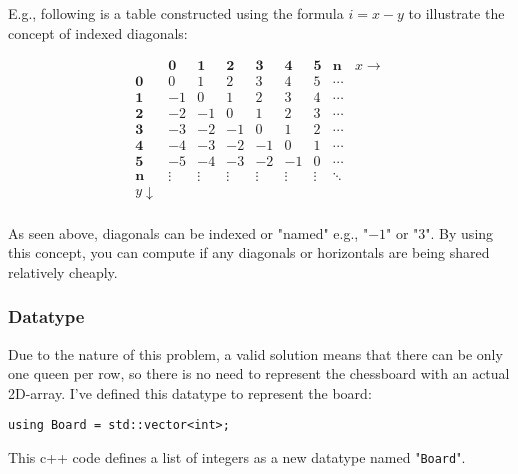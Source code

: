 \documentclass{article}
\begin{document}
E.g., following is a table constructed using the formula $i = x-y$ to illustrate the concept of indexed diagonals:

\[
    \begin{array}{c|cccccccc}
                   & \mathbf{0} & \mathbf{1} & \mathbf{2} & \mathbf{3} & \mathbf{4} & \mathbf{5} & \mathbf{n} & x \rightarrow \\
        \hline
        \mathbf{0} & 0          & 1          & 2          & 3          & 4          & 5          & \cdots                     \\
        \mathbf{1} & -1         & 0          & 1          & 2          & 3          & 4          & \cdots                     \\
        \mathbf{2} & -2         & -1         & 0          & 1          & 2          & 3          & \cdots                     \\
        \mathbf{3} & -3         & -2         & -1         & 0          & 1          & 2          & \cdots                     \\
        \mathbf{4} & -4         & -3         & -2         & -1         & 0          & 1          & \cdots                     \\
        \mathbf{5} & -5         & -4         & -3         & -2         & -1         & 0          & \cdots                     \\
        \mathbf{n} & \vdots     & \vdots     & \vdots     & \vdots     & \vdots     & \vdots     & \ddots                     \\
        y \downarrow                                                                                                          \\
    \end{array}
\]


As seen above, diagonals can be indexed or "named" e.g., "$-1$" or "$3$".
By using this concept, you can compute if any diagonals or horizontals are being shared relatively cheaply.

\subsubsection{Datatype}
Due to the nature of this problem, a valid solution means that there can be only one queen per row, so there is no need to represent the chessboard with an actual 2D-array.
I've defined this datatype to represent the board:

\begin{lstlisting}
using Board = std::vector<int>;
\end{lstlisting}
This c++ code defines a list of integers as a new datatype named "\texttt{Board}".
\end{document}
